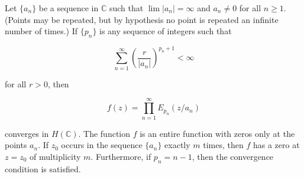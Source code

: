 Let $\{a_n\}$ be a sequence in $\mathbb{C}$ such that $\lim |a_n| = \infty$ and $a_n \neq 0$ for all $n \geq 1$. (Points may be repeated, but by hypothesis no point is repeated an infinite number of times.) If $\{p_n\}$ is any sequence of integers such that

$$\sum_{n=1}^{\infty} \left( \frac{r}{|a_n|} \right)^{p_n+1} < \infty$$

for all $r > 0$, then

$$f(z) = \prod_{n=1}^{\infty} E_{p_n}(z/a_n)$$

converges in $H(\mathbb{C})$. The function $f$ is an entire function with zeros only at the points $a_n$. If $z_0$ occurs in the sequence $\{a_n\}$ exactly $m$ times, then $f$ has a zero at $z = z_0$ of multiplicity $m$. Furthermore, if $p_n = n-1$, then the convergence condition is satisfied.
